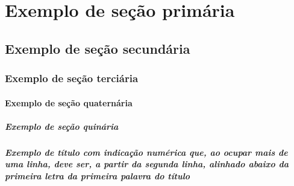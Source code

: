 \chapter{Exemplo de seção primária} 
  \lipsum[1-1]

  \section{Exemplo de seção secundária}
  \lipsum[2-4]

  \subsection{Exemplo de seção terciária}
  \lipsum[5-5]

  \subsubsection{Exemplo de seção quaternária}
  \lipsum[6-6]

  \paragraph{Exemplo de seção quinária} %
  \lipsum[7-7]

  \paragraph{Exemplo de título com indicação numérica que, ao ocupar mais de uma linha, deve ser, a partir da segunda linha, alinhado abaixo da primeira letra da primeira palavra do título}
  \lipsum[8-8]